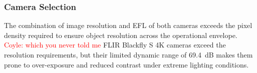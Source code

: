 \documentclass{erauthesis}
\begin{document}
\subsubsection{Camera Selection} \label{camera_selection}

The combination of image resolution and \ac{EFL} of both cameras exceeds the pixel density required to ensure object resolution across the operational envelope.
\textcolor{red}{Coyle: which you never told me}
FLIR Blackfly S 4K cameras exceed the resolution requirements, but their limited dynamic range of 69.4~dB makes them prone to over-exposure and reduced contrast under extreme lighting conditions. 
\end{document}
